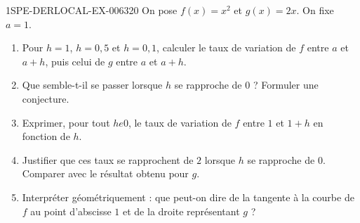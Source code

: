 \begin{exercice}{1SPE-DERLOCAL-EX-006}{3}{20}
On pose $f(x)=x^2$ et $g(x)=2x$. On fixe $a=1$.

\begin{enumerate}
  \item Pour $h=1$, $h=0{,}5$ et $h=0{,}1$, calculer le taux de variation de $f$ entre $a$ et $a+h$, puis celui de $g$ entre $a$ et $a+h$.
  \item Que semble-t-il se passer lorsque $h$ se rapproche de $0$ ? Formuler une conjecture.
  \item Exprimer, pour tout $h
e 0$, le taux de variation de $f$ entre $1$ et $1+h$ en fonction de $h$.
  \item Justifier que ces taux se rapprochent de $2$ lorsque $h$ se rapproche de $0$. Comparer avec le résultat obtenu pour $g$.
  \item Interpréter géométriquement : que peut-on dire de la tangente à la courbe de $f$ au point d'abscisse $1$ et de la droite représentant $g$ ?
\end{enumerate}
\end{exercice}
